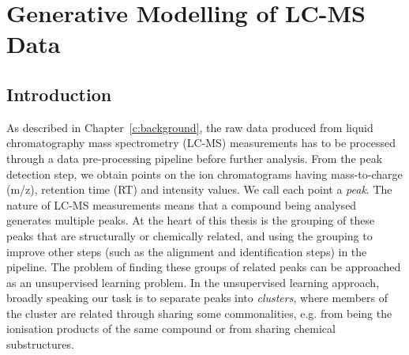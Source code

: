 \chapter{Generative Modelling of LC-MS Data}
\label{c:ml-background}


\section{Introduction}

As described in Chapter~\ref{c:background}, the raw data produced from liquid chromatography mass spectrometry (LC-MS) measurements has to be processed through a data pre-processing pipeline before further analysis. From the peak detection step, we obtain points on the ion chromatograms having mass-to-charge (m/z), retention time (RT) and intensity values. We call each point a \emph{peak}. The nature of LC-MS measurements means that a compound being analysed generates multiple peaks. At the heart of this thesis is the grouping of these peaks that are structurally or chemically related, and using the grouping to improve other steps (such as the alignment and identification steps) in the pipeline. The problem of finding these groups of related peaks can be approached as an unsupervised learning problem. In the unsupervised learning approach, broadly speaking our task is to separate peaks into \emph{clusters}, where members of the cluster are related through sharing some commonalities, e.g. from being the ionisation products of the same compound or from sharing chemical substructures. 


